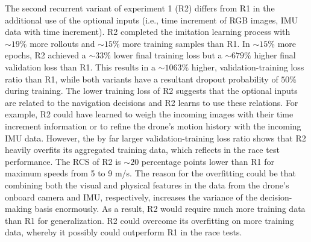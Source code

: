 
The second recurrent variant of experiment 1 (R2) differs from R1 in the additional 
use of the optional inputs (i.e., time increment of RGB images, IMU data with time increment). 
R2 completed the imitation learning process with $\sim 19\%$ more rollouts and $\sim 15\%$ 
more training 
samples than R1. In $\sim 15\%$ more epochs, R2 achieved a $\sim 33\%$ 
lower final training loss but
a $\sim 679\%$ higher final validation loss than R1. This results in a $\sim 1063\%$ higher, 
validation-training loss ratio than R1, while both variants have a resultant dropout probability 
of $50\%$ during training. The lower training loss of R2 suggests that the optional inputs are 
related to the navigation decisions and R2 learns to use these relations. For example, R2 could 
have learned to weigh the incoming images with their time increment information or to refine 
the drone's motion history with the incoming IMU data. However, the by far larger 
validation-training loss ratio shows that R2 heavily overfits its aggregated training data, 
which reflects in the race test performance. The RCS of R2 is $\sim 20$ percentage points lower 
than R1 for maximum speeds from 5 to 9 m/s. The reason for the overfitting could be that 
combining both the visual and physical features in the data from the drone's onboard camera 
and IMU, respectively, increases the variance of the decision-making basis enormously. 
As a result, R2 would 
require much more training data than R1 for generalization. R2 could overcome its overfitting 
on more training data, whereby it possibly could outperform R1 in the race tests.



